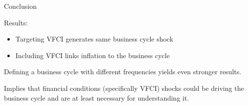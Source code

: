 \begin{frame}{Conclusion}

  Results:
  \begin{itemize}
    \item Targeting VFCI generates same business cycle shock
    \item Including VFCI links inflation to the business cycle
  \end{itemize}

  Defining a business cycle with different frequencies yields even stronger results.

  \vspace{1cm}

  Implies that financial conditions (specifically VFCI) shocks could be driving the business cycle and are at least necessary for understanding it.


\end{frame}